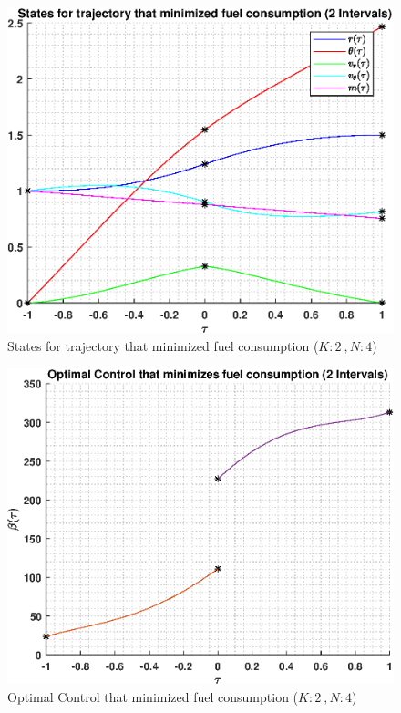 \documentclass[]{article}
\begin{document}
\begin{figure}
	\centering
	\includegraphics[scale=0.75]{directStatesK2Poly4.eps}
	\caption{States for trajectory that minimized fuel consumption (\(K:2\ , N:4\))}
	\label{fig:directStatesK2Poly4}
\end{figure}
\begin{figure}
	\centering
	\includegraphics[scale=0.75]{directControlK2Poly4.eps}
	\caption{Optimal Control that minimized fuel consumption (\(K:2\ , N:4\))}
	\label{fig:directControlK2Poly4}
\end{figure}
\end{document}
